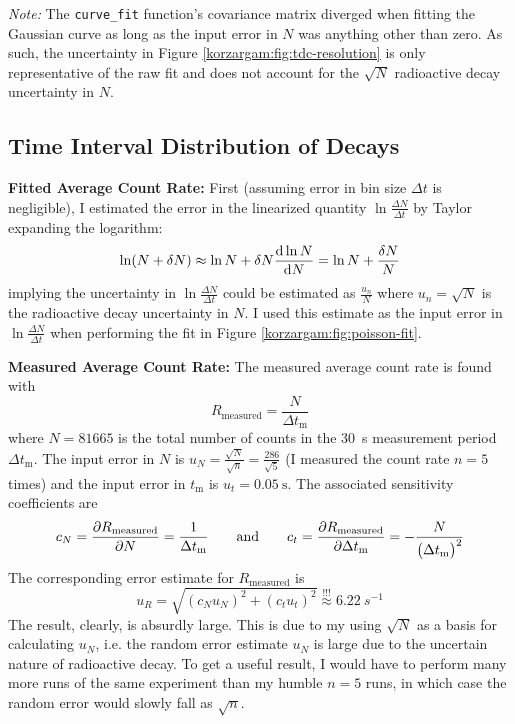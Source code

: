 \documentclass[11pt, a4paper]{article}
\newcommand{\eqtext}[1]{\qquad \text{#1} \qquad}
\begin{document}
\vspace{2mm}
\textit{Note:} The \texttt{curve\_fit} function's covariance matrix diverged when fitting the Gaussian curve as long as the input error in $ N $ was anything other than zero. As such, the uncertainty in Figure \ref{korzargam:fig:tdc-resolution} is only representative of the raw fit and does not account for the $ \sqrt{N} $ radioactive decay uncertainty in $ N $. 

\subsection{Time Interval Distribution of Decays}
\textbf{Fitted Average Count Rate:} First (assuming error in bin size $ \Delta t $ is negligible), I estimated the error in the linearized quantity $ \ln \frac{\Delta N}{\Delta t} $ by Taylor expanding the logarithm:
\begin{equation*}
	\ln(N + \delta N) \approx \ln N  + \delta N \dv{\ln N}{N} = \ln N + \frac{\delta N}{N}
\end{equation*}
implying the uncertainty in $ \ln \frac{\Delta N}{\Delta t} $ could be estimated as $ \frac{u_{n}}{N} $ where $ u_{n} = \sqrt{N} $ is the radioactive decay uncertainty in $ N $. I used this estimate as the input error in $  \ln \frac{\Delta N}{\Delta t} $ when performing the fit in Figure \ref{korzargam:fig:poisson-fit}. 

\vspace{2mm}
\textbf{Measured Average Count Rate:} The measured average count rate is found with
\begin{equation*}
	R_{\text{measured}} = \frac{N}{\Delta t_{\text{m}}}
\end{equation*}
where $ N = 81665 $ is the total number of counts in the \SI{30}{\second} measurement period  $ \Delta t_{\text{m}} $. The input error in $ N $ is $ u_{N} = \frac{\sqrt{N}}{\sqrt{n}} = \frac{286}{\sqrt{5}} $ (I measured the count rate $ n = 5 $ times) and the input error in $ t_{\text{m}}  $ is $ u_{t} = \SI{0.05}{\second} $. The associated sensitivity coefficients are
\begin{equation*}
	c_{N} = \pdv{R_{\text{measured}}}{N} = \frac{1}{\Delta t_{\text{m}}} \eqtext{and} c_{t} =  \pdv{R_{\text{measured}}}{\Delta t_{\text{m}}} = - \frac{N}{\big(\Delta t_{\text{m}}\big)^{2}}
\end{equation*}
The corresponding error estimate for $ R_{\text{measured}} $ is
\begin{equation*}
	u_{R} = \sqrt{(c_{N}u_{N})^{2} + (c_{t}u_{t})^{2}} \stackrel{!!!}{\approx} \SI{6.22}{s^{-1}}
\end{equation*}
The result, clearly, is absurdly large. This is due to my using $ \sqrt{N} $ as a basis for calculating $ u_{N} $, i.e. the random error estimate $ u_{N} $ is large due to the uncertain nature of radioactive decay. To get a useful result, I would have to perform many more runs of the same experiment than my humble $ n = 5 $ runs, in which case the random error would slowly fall as $ \sqrt{n} $. 
\end{document}
